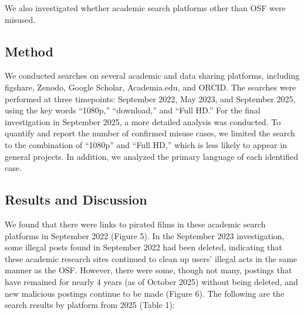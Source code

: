 \documentclass[authordate, meta, issue]{jote-new-article}
\begin{document}
	We also investigated whether academic search platforms other than OSF were misused.







	\subsection{Method }



	We conducted searches on several academic and data sharing platforms, including figshare, Zenodo, Google Scholar, Academia.edu, and ORCID. The searches were performed at three timepoints: September 2022, May 2023, and September 2025, using the key words “1080p,” “download,” and “Full HD.” For the final investigation in September 2025, a more detailed analysis was conducted. To quantify and report the number of confirmed misuse cases, we limited the search to the combination of “1080p” and “Full HD,” which is less likely to appear in general projects. In addition, we analyzed the primary language of each identified case.







	\subsection{Results and Discussion }



	We found that there were links to pirated films in these academic search platforms in September 2022 (Figure 5). In the September 2023 investigation, some illegal posts found in September 2022 had been deleted, indicating that these academic research sites continued to clean up users' illegal acts in the same manner as the OSF. However, there were some, though not many, postings that have remained for nearly 4 years (as of October 2025) without being deleted, and new malicious postings continue to be made (Figure 6). The following are the search results by platform from 2025 (Table 1):
\end{document}
